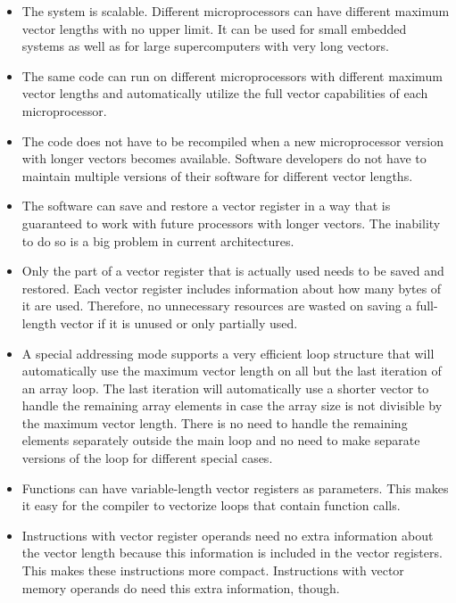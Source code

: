 \documentclass[forwardcom.tex]{subfiles}
\begin{document}
\begin{itemize}
\item The system is scalable. Different microprocessors can have different maximum vector lengths with no upper limit. It can be used for small embedded systems as well as for large supercomputers with very long vectors. 

\item The same code can run on different microprocessors with different maximum vector lengths and automatically utilize the full vector capabilities of each microprocessor. 

\item The code does not have to be recompiled when a new microprocessor version with longer vectors becomes available. Software developers do not have to maintain multiple versions of their software for different vector lengths. 

\item The software can save and restore a vector register in a way that is guaranteed to work with future processors with longer vectors. The inability to do so is a big problem in current architectures. 

\item Only the part of a vector register that is actually used needs to be saved and restored. Each vector register includes information about how many bytes of it are used. Therefore, no unnecessary resources are wasted on saving a full-length vector if it is unused or only partially used. 

\item A special addressing mode supports a very efficient loop structure that will automatically use the maximum vector length on all but the last iteration of an array loop. The last iteration will automatically use a shorter vector to handle the remaining array elements in case the array size is not divisible by the maximum vector length. There is no need to handle the remaining elements separately outside the main loop and no need to make separate versions of the loop for different special cases. 

\item Functions can have variable-length vector registers as parameters. This makes it easy for the compiler to vectorize loops that contain function calls. 

\item Instructions with vector register operands need no extra information about the vector length because this information is included in the vector registers. This makes these instructions more compact. Instructions with vector memory operands do need this extra information, though.


\end{itemize}
\end{document}
